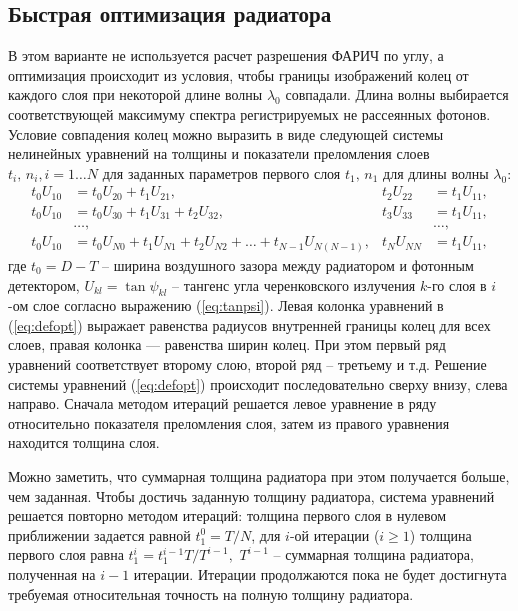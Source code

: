 \documentclass[12pt]{article}
\begin{document}
\subsection{Быстрая оптимизация радиатора}
\label{ss:defopt}
В этом варианте не используется расчет разрешения ФАРИЧ по углу, а оптимизация происходит из условия, чтобы границы изображений колец от каждого слоя при 
некоторой длине волны $\lambda_0$ совпадали. Длина волны выбирается соответствующей максимуму спектра регистрируемых не рассеянных фотонов.
Условие совпадения колец можно выразить в виде следующей системы нелинейных уравнений на толщины и показатели преломления слоев $t_i,\,n_i, i=1\ldots N$ для заданных
параметров первого слоя $t_1,\,n_1$ для длины волны $\lambda_0$:
\begin{align}\label{eq:defopt}
t_0 U_{10} & = t_0 U_{20} + t_1 U_{21},              & t_2 U_{22} & = t_1 U_{11}, \nonumber\\
t_0 U_{10} & = t_0 U_{30} + t_1 U_{31} + t_2 U_{32}, & t_3 U_{33} & = t_1 U_{11}, \nonumber\\
& \ldots, & & \ldots, \\
t_0 U_{10} & = t_0 U_{N0} + t_1 U_{N1} + t_2 U_{N2} + \ldots + t_{N-1} U_{N(N-1)}, & t_N U_{NN} & = t_1 U_{11}, \nonumber
\end{align}
где $t_0=D-T$ -- ширина воздушного зазора между радиатором и фотонным детектором, $U_{kl} = \tan\psi_{kl}$ -- тангенс угла черенковского излучения $k$-го слоя в $i$-ом слое
согласно выражению (\ref{eq:tanpsi}). Левая колонка уравнений в (\ref{eq:defopt}) выражает равенства радиусов внутренней границы колец для всех слоев, правая колонка --- равенства
ширин колец. При этом первый ряд уравнений соответствует второму слою, второй ряд -- третьему и т.д. Решение системы уравнений (\ref{eq:defopt}) происходит последовательно 
сверху внизу, слева направо. Сначала методом итераций решается левое уравнение в ряду относительно показателя преломления слоя, затем из правого уравнения находится толщина слоя.

Можно заметить, что суммарная толщина радиатора при этом получается больше, чем заданная. Чтобы достичь заданную толщину радиатора, система уравнений решается повторно методом итераций: толщина первого слоя в нулевом приближении задается равной $t_1^0 = T/N$, 
для $i$-ой итерации ($i\geq 1$) толщина первого слоя равна $t_1^i=t_1^{i-1} T/T^{i-1},$ $T^{i-1}$ -- суммарная толщина радиатора, полученная на $i-1$ итерации. 
Итерации продолжаются пока не будет достигнута требуемая относительная точность на полную толщину радиатора.
\end{document}
